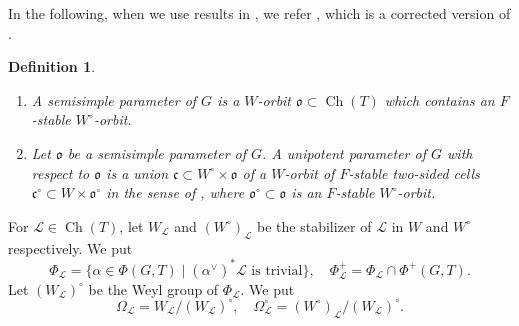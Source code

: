 \documentclass[12pt,a4paper]{article}
\newtheorem{defn}[thm]{Definition}
\DeclareMathOperator{\Ch}{Ch}
\newcommand{\mc}{\mathcal}
\newcommand{\mf}{\mathfrak}
\begin{document}
In the following, when we use results in \cite{LuYuEndHecch}, we refer \cite{LuYuEndHecchv3}, which is a corrected version of \cite{LuYuEndHecch}. 

\begin{defn}\label{defn:ssunippara}
	\begin{enumerate}
		\item\label{en:sspar}
		A semisimple parameter of $G$ is a $W$-orbit $\mf{o} \subset \Ch (T)$ which contains an $F$-stable $W^{\circ}$-orbit.   
		\item\label{en:unippar}
		Let $\mf{o}$ be a semisimple parameter of $G$. 
		A unipotent parameter of $G$ with respect to $\mf{o}$ is a union $\mf{c} \subset W^{\circ} \times \mf{o}$ of a $W$-orbit of $F$-stable two-sided cells $\mf{c}^{\circ} \subset W \times \mf{o}^{\circ}$ in the sense of \cite[11.4]{LuYuEndHecchv3}, 
		where $\mf{o}^{\circ} \subset \mf{o}$ is an $F$-stable $W^{\circ}$-orbit. 
	\end{enumerate}
\end{defn}

For $\mc{L} \in \Ch (T)$, let $W_{\mc{L}}$ and $(W^{\circ})_{\mc{L}}$ be the stabilizer of $\mc{L}$ in $W$ and $W^{\circ}$ respectively. 
We put 
\[
 \Phi_{\mc{L}}=\{ \alpha \in \Phi(G,T) \mid  \textrm{$(\alpha^{\vee})^* \mc{L}$ is trivial}\}, \quad 
  \Phi_{\mc{L}}^+ =\Phi_{\mc{L}} \cap \Phi^+ (G,T). 
\]
Let $(W_{\mc{L}})^{\circ}$ be the Weyl group of $\Phi_{\mc{L}}$. We put 
\[
 \Omega_{\mc{L}}=W_{\mc{L}}/(W_{\mc{L}})^{\circ}, \quad 
 \Omega_{\mc{L}}^{\circ}=(W^{\circ})_{\mc{L}}/(W_{\mc{L}})^{\circ}. 
\]
\end{document}
